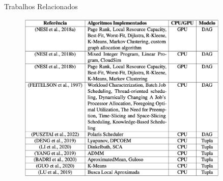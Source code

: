 \begin{frame}{Trabalhos Relacionados}
    \begin{figure}
        \centering
        \includegraphics[width=0.9\textwidth]{Figuras/trabalhos-relacionados.png}
    \end{figure}
\end{frame}

